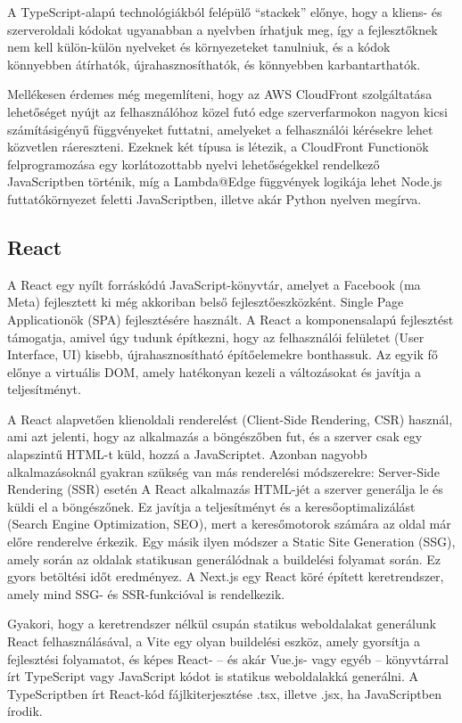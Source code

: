 A TypeScript-alapú technológiákból felépülő ``stackek'' előnye, hogy a kliens- és szerveroldali kódokat ugyanabban a nyelvben írhatjuk meg, így a fejlesztőknek nem kell külön-külön nyelveket és környezeteket tanulniuk, és a kódok könnyebben átírhatók, újrahasznosíthatók, és könnyebben karbantarthatók.

Mellékesen érdemes még megemlíteni, hogy az AWS CloudFront szolgáltatása lehetőséget nyújt az felhasználóhoz közel futó edge szerverfarmokon nagyon kicsi számításigényű függvényeket futtatni, amelyeket a felhasználói kérésekre lehet közvetlen ráereszteni. Ezeknek két típusa is létezik, a CloudFront Functionök felprogramozása egy korlátozottabb nyelvi lehetőségekkel rendelkező JavaScriptben történik, míg a Lambda@Edge függvények logikája lehet Node.js futtatókörnyezet feletti JavaScriptben, illetve akár Python nyelven megírva.

\subsection{React}

A React egy nyílt forráskódú JavaScript-könyvtár, amelyet a Facebook (ma Meta) fejlesztett ki még akkoriban belső fejlesztőeszközként. Single Page Applicationök (SPA) fejlesztésére használt. A React a komponensalapú fejlesztést támogatja, amivel úgy tudunk építkezni, hogy az felhasználói felületet (User Interface, UI) kisebb, újrahasznosítható építőelemekre bonthassuk. Az egyik fő előnye a virtuális DOM, amely hatékonyan kezeli a változásokat és javítja a teljesítményt.

A React alapvetően klienoldali renderelést (Client-Side Rendering, CSR) használ, ami azt jelenti, hogy az alkalmazás a böngészőben fut, és a szerver csak egy alapszintű HTML-t küld, hozzá a JavaScriptet. Azonban nagyobb alkalmazásoknál gyakran szükség van más renderelési módszerekre: Server-Side Rendering (SSR) esetén A React alkalmazás HTML-jét a szerver generálja le és küldi el a böngészőnek. Ez javítja a teljesítményt és a keresőoptimalizálást (Search Engine Optimization, SEO), mert a keresőmotorok számára az oldal már előre renderelve érkezik. Egy másik ilyen módszer a Static Site Generation (SSG), amely során az oldalak statikusan generálódnak a buildelési folyamat során. Ez gyors betöltési időt eredményez. A Next.js egy React köré épített keretrendszer, amely mind SSG- és SSR-funkcióval is rendelkezik.

Gyakori, hogy a keretrendszer nélkül csupán statikus weboldalakat generálunk React felhasználásával, a Vite egy olyan buildelési eszköz, amely gyorsítja a fejlesztési folyamatot, és képes React- -- és akár Vue.js- vagy egyéb -- könyvtárral írt TypeScript vagy JavaScript kódot is statikus weboldalakká generálni. A TypeScriptben írt React-kód fájlkiterjesztése .tsx, illetve .jsx, ha JavaScriptben írodik.

